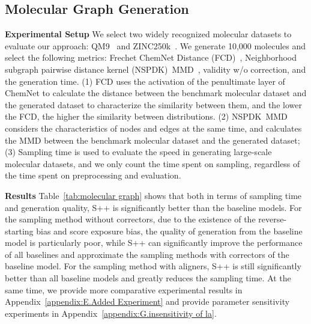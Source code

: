 \documentclass{article}
\begin{document}
\subsection{Molecular Graph Generation}
\textbf{Experimental Setup} We select two widely recognized molecular datasets to evaluate our approach: QM9~\citep{ramakrishnan2014quantum} and ZINC250k~\citep{irwin2012zinc}. We generate 10,000 molecules and select the following metrics: Frechet ChemNet Distance (FCD)~\citep{preuer2018frechet}, Neighborhood subgraph pairwise distance kernel (NSPDK)~MMD~\citep{costa2010fast}, validity w/o correction, and the generation time. (1) FCD uses the activation of the penultimate layer of ChemNet to calculate the distance between the benchmark molecular dataset and the generated dataset to characterize the similarity between them, and the lower the FCD, the higher the similarity between distributions. (2) NSPDK~MMD considers the characteristics of nodes and edges at the same time, and calculates the MMD between the benchmark molecular dataset and the generated dataset; (3) Sampling time is used to evaluate the speed in generating large-scale molecular datasets, and we only count the time spent on sampling, regardless of the time spent on preprocessing and evaluation.

\textbf{Results} Table~\ref{tab:molecular graph} shows that both in terms of sampling time and generation quality, S++ is significantly better than the baseline models. For the sampling method without correctors, due to the existence of the reverse-starting bias and score exposure bias, the quality of generation from the baseline model is particularly poor, while S++ can significantly improve the performance of all baselines and approximate the sampling methods with correctors of the baseline model. For the sampling method with aligners, S++ is still significantly better than all baseline models and greatly reduces the sampling time. At the same time, we provide more comparative experimental results in Appendix~\ref{appendix:E.Added Experiment} and provide parameter sensitivity experiments in Appendix~\ref{appendix:G.insensitivity of la}.
\end{document}
